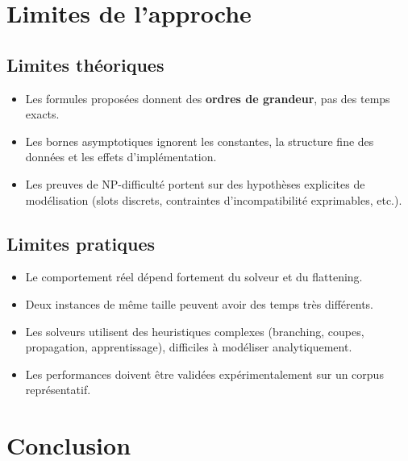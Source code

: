 \documentclass[12pt,a4paper]{article}
\begin{document}
\section{Limites de l'approche}

\subsection{Limites théoriques}
\begin{itemize}
  \item Les formules proposées donnent des \textbf{ordres de grandeur}, pas des temps exacts.
  \item Les bornes asymptotiques ignorent les constantes, la structure fine des données et les effets d'implémentation.
  \item Les preuves de NP-difficulté portent sur des hypothèses explicites de modélisation (slots discrets, contraintes d'incompatibilité exprimables, etc.).
\end{itemize}

\subsection{Limites pratiques}
\begin{itemize}
  \item Le comportement réel dépend fortement du solveur et du flattening.
  \item Deux instances de même taille peuvent avoir des temps très différents.
  \item Les solveurs utilisent des heuristiques complexes (branching, coupes, propagation, apprentissage), difficiles à modéliser analytiquement.
  \item Les performances doivent être validées expérimentalement sur un corpus représentatif.
\end{itemize}

\section{Conclusion}
\end{document}
